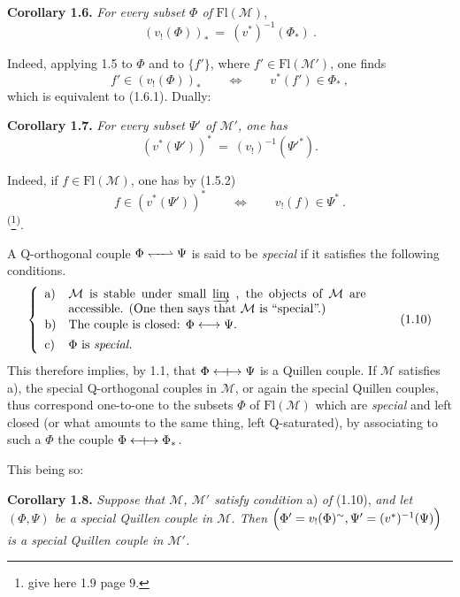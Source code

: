\documentclass[11pt]{article}
\newcommand{\printedpage}[1]{\marginpar{\footnotesize p.~#1}}
\newcommand{\msp}[1]{\marginpar{\footnotesize [#1]}}
\newcommand{\Qorth}{\mathrel{\leftharpoondown\mkern-6mu\relbar\mkern-6mu\rightharpoonup}}
\newcommand{\Qcouple}{\mathrel{\leftarrow\mkern-9mu{+}\mkern-9mu\rightarrow}}
\newcommand{\clos}{\longleftrightarrow}
\begin{document}
\textbf{Corollary 1.6.} \textit{For every subset $\Phi$ of} $\mathrm{Fl}(\mathcal{M})$,
\[
(v_{!}(\Phi))_{*} \ =\ (v^{*})^{-1}(\Phi_{*})\ . \tag*{(1.6.1)}
\]

\printedpage{5}

Indeed, applying 1.5 to $\Phi$ and to $\{f'\}$, where $f' \in \mathrm{Fl}(\mathcal{M}')$, one finds
\[
f' \in (v_{!}(\Phi))_{*} \qquad \Longleftrightarrow \qquad v^{*}(f') \in \Phi_{*}\ ,
\]
which is equivalent to (1.6.1). Dually:

\textbf{Corollary 1.7.} \textit{For every subset $\Psi'$ of $\mathcal{M}'$, one has}
\[
(v^{*}(\Psi'))^{*} \ =\ (v_{!})^{-1}(\Psi'^{*}). \tag*{(1.7.1)}
\]

Indeed, if $f \in \mathrm{Fl}(\mathcal{M})$, one has by (1.5.2)
\[
f \in (v^{*}(\Psi'))^{*} \qquad \Longleftrightarrow \qquad v_{!}(f) \in \Psi^{*}\ . %
\]
\textsuperscript{(}\footnote[3]{give here 1.9 page 9.}\textsuperscript{)}.

\msp{page 8}
A Q-orthogonal couple $\Phi \Qorth \Psi$ is said to be \textit{special} if it satisfies the following conditions.
\[
\left\{
\begin{array}{ll}
\text{a)} & \parbox[t]{0.7\textwidth}{$\mathcal{M}$ is stable under small $\varinjlim$ , the objects of $\mathcal{M}$ are accessible. (One then says that $\mathcal{M}$ is ``special''.)} \\[3ex]
\text{b)} & \text{The couple is closed: } \Phi \clos \Psi. \\[1ex]
\text{c)} & \Phi \text{ is \textit{special.}}
\end{array}
\right.
\tag*{(1.10)}
\]
This therefore implies, by 1.1, that $\Phi \Qcouple \Psi$ is a Quillen couple. If $\mathcal{M}$ satisfies a), the special Q-orthogonal couples in $\mathcal{M}$, or again the special Quillen couples, thus correspond one-to-one to the subsets $\Phi$ of $\mathrm{Fl}(\mathcal{M})$ which are \textit{special} and left closed (or what amounts to the same thing, left Q-saturated), by associating to such a $\Phi$ the couple $\Phi \Qcouple \Phi_{*}$.

This being so:

\marginpar{$\Vert$}%
\textbf{Corollary 1.8.} \textit{Suppose that $\mathcal{M}$, $\mathcal{M}'$ satisfy condition} a) \textit{of} (1.10), \textit{and let $(\Phi, \Psi)$ be a special Quillen couple in $\mathcal{M}$. Then $\Bigl(\Phi' = v_{!}(\Phi)^{\sim}, \Psi' = (v^{*})^{-1}(\Psi)\Bigr)$ is a special Quillen couple in $\mathcal{M}'$.}
\end{document}
